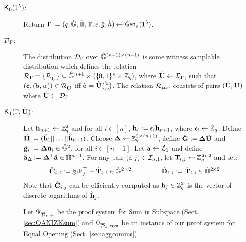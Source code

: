 \begin{description}

\item[$\mathsf{K}_0(1^\lambda)$:]  Return $\Gamma := (q,{\hat{\mathbb{G}}},{\check{\mathbb{H}}},\mathbb{T},e,\hat{g},\check{h}) \leftarrow \mathsf{Gen}_a(1^{\lambda})$.

\item[$\mathcal{D}_\Gamma$:] The distribution $\mathcal{D}_\Gamma$ over ${\hat{\mathbb{G}}}^{(n+1) \times (n+1)}$ is some witness samplable distribution which 
defines the relation $\mathcal{R}_\Gamma = \{\mathcal{R}_{{\hat{\mathbf{{U}}}}}\} 
\subseteq {\ensuremath{\hat{\mathbb{G}}}}^{n+1}\times(\{0,1\}^{n}\times\mathbb{Z}_q)$,
where ${\hat{\mathbf{{U}}}}\gets\mathcal{D}_\Gamma$,
such that $({\hat{\mathbf{c}}},\langle\mathbf{b}, w\rangle)\in\mathcal{R}_{{\hat{\mathbf{{U}}}}}$ iff
${\hat{\mathbf{c}}}={\hat{\mathbf{{U}}}}\binom{\mathbf{b}}{w}$. The relation $\mathcal{R}_{par}$ consists of pairs $({\hat{\mathbf{{U}}}},\mathbf{{U}})$ where ${\hat{\mathbf{{U}}}} \gets \mathcal{D}_{\Gamma}$.
\item[$\mathsf{K}_1(\Gamma, {\hat{\mathbf{{U}}}})$:]
Let $\mathbf{h}_{n+1}\gets \mathbb{Z}_q^2$
and for all $i \in [n]$, $\mathbf{h}_{i}:=\epsilon_{i}\mathbf{h}_{n+1}$, where
$\epsilon_{i} \leftarrow \mathbb{Z}_q$. Define
$\check{\mathbf{{H}}} := (\check{\mathbf{h}}_1|| \ldots ||\check{\mathbf{h}}_{n+1})$.
Choose 
$\mathbf{{\Delta}} \leftarrow \mathbb{Z}_q^{2 \times (n+1)}$,
define $\hat{\mathbf{{G}}} := \mathbf{{\Delta}}{\hat{\mathbf{{U}}}}$
and $\hat{\mathbf{g}}_{i}:=\mathbf{{\Delta}} \hat{\mathbf{u}}_i \in {\ensuremath{\hat{\mathbb{G}}}}^2$, for all $i \in [n+1]$. 
Let $\mathbf{a} \leftarrow \mathcal{L}_{1}$ and define $\check{\mathbf{a}}_{\Delta}:=\mathbf{{\Delta}}^\top\check{\mathbf{a}} \in {\ensuremath{\check{\mathbb{H}}}}^{n+1}$. 
For any pair $(i,j) \in \mathcal{I}_{n,1}$, let 
$\mathbf{{T}}_{i,j}\gets\mathbb{Z}_q^{2\times2}$ and set:
$${\hat{\mathbf{{C}}}}_{i,j}:=\hat{\mathbf{g}}_i \mathbf{h}_j^{\top} - {\hat{\mathbf{{T}}}}_{i,j}  \in {\ensuremath{\hat{\mathbb{G}}}}^{2 \times 2},
\qquad \qquad 
\check{\mathbf{{D}}}_{i,j}:=\check{\mathbf{{T}}}_{i,j} \in {\ensuremath{\check{\mathbb{H}}}}^{2 \times 2}.$$ 
Note that ${\hat{\mathbf{{C}}}}_{i,j}$ can be efficiently computed 
as $\mathbf{h}_j \in \mathbb{Z}_q^{2}$ is the vector of discrete logarithms of $\check{\mathbf{h}}_j$.

Let ${\Psi_{\overline{\mathcal{D}}_k,+}}$ be the proof system for Sum in Subspace 
(Sect. \ref{sec:QANIZKsum}) and ${\Psi_{\overline{\mathcal{D}}_k,\mathsf{com}}}$
be an instance of our proof system for Equal Opening (Sect. \ref{sec:aggcomms}).


\end{description}
